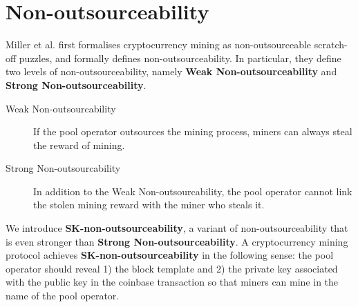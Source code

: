 \section{Non-outsourceability}



Miller et al. \cite{miller2015nonoutsourceable} first formalises cryptocurrency mining as non-outsourceable scratch-off puzzles, and formally defines non-outsourceability.
In particular, they define two levels of non-outsourceability, namely \textbf{Weak Non-outsourceability} and \textbf{Strong Non-outsourceability}.

\begin{description}
    \item[Weak Non-outsourcability] If the pool operator outsources the mining process, miners can always steal the reward of mining.
    \item[Strong Non-outsourcability] In addition to the Weak Non-outsourcability, the pool operator cannot link the stolen mining reward with the miner who steals it.
\end{description}

We introduce \textbf{SK-non-outsourceability}, a variant of non-outsourceability that is even stronger than \textbf{Strong Non-outsourceability}.
A cryptocurrency mining protocol achieves \textbf{SK-non-outsourceability} in the following sense: the pool operator should reveal 1) the block template and 2) the private key associated with the public key in the coinbase transaction so that miners can mine in the name of the pool operator.

